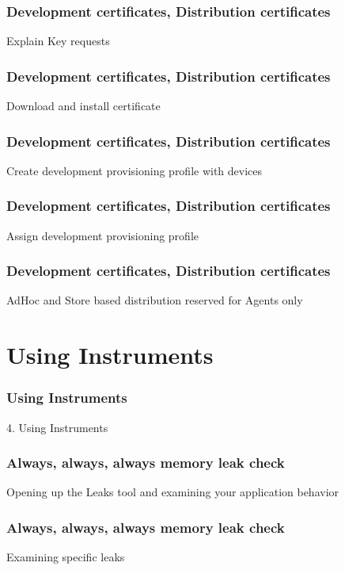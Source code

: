 \documentclass[10pt]{beamer}
\begin{document}
\begin{frame}[fragile]
  \frametitle{Development certificates, Distribution certificates}
  Explain Key requests

\end{frame}

\begin{frame}[fragile]
  \frametitle{Development certificates, Distribution certificates}
  Download and install certificate

\end{frame}

\begin{frame}[fragile]
  \frametitle{Development certificates, Distribution certificates}
  Create development provisioning profile with devices

\end{frame}

\begin{frame}[fragile]
  \frametitle{Development certificates, Distribution certificates}
  Assign development provisioning profile

\end{frame}

\begin{frame}[fragile]
  \frametitle{Development certificates, Distribution certificates}
  AdHoc and Store based distribution reserved for Agents only

\end{frame}

    

   
  

  
    
\section{Using Instruments}
\begin{frame}[fragile]
  \frametitle{Using Instruments}
  4. Using Instruments
\end{frame}


    
\begin{frame}[fragile]
  \frametitle{Always, always, always memory leak check}
  Opening up the Leaks tool and examining your application behavior

\end{frame}

\begin{frame}[fragile]
  \frametitle{Always, always, always memory leak check}
  Examining specific leaks

\end{frame}
\end{document}
